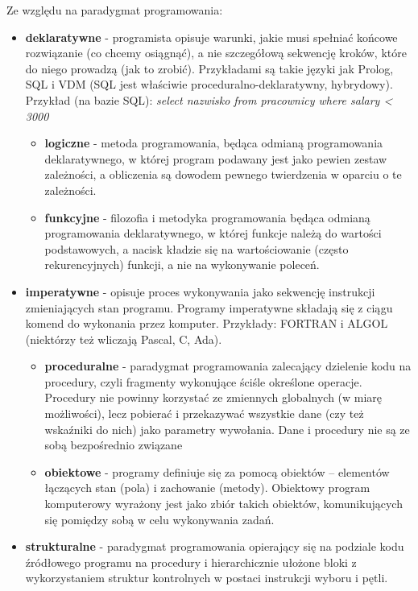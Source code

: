 \documentclass[12pt,a4paper]{article}
\begin{document}
	Ze względu na paradygmat programowania:	
	\begin{itemize}
		\item \textbf{deklaratywne} - programista opisuje warunki, jakie musi spełniać końcowe rozwiązanie (co chcemy osiągnąć), a nie szczegółową sekwencję kroków, które do niego prowadzą (jak to zrobić). Przykładami są takie języki jak Prolog, SQL i VDM (SQL jest właściwie proceduralno-deklaratywny, hybrydowy). Przykład (na bazie SQL): \textit{select nazwisko from pracownicy where salary < 3000}
		\begin{itemize}
			\item \textbf{logiczne} - metoda programowania, będąca odmianą programowania deklaratywnego, w której program podawany jest jako pewien zestaw zależności, a obliczenia są dowodem pewnego twierdzenia w oparciu o te zależności.
			\item \textbf{funkcyjne} - filozofia i metodyka programowania będąca odmianą programowania deklaratywnego, w której funkcje należą do wartości podstawowych, a nacisk kładzie się na wartościowanie (często rekurencyjnych) funkcji, a nie na wykonywanie poleceń.
		\end{itemize}
		\item \textbf{imperatywne} - opisuje proces wykonywania jako sekwencję instrukcji zmieniających stan programu. Programy imperatywne składają się z ciągu komend do wykonania przez komputer. Przykłady: FORTRAN i ALGOL (niektórzy też wliczają Pascal, C, Ada).
		\begin{itemize}
			\item \textbf{proceduralne} - paradygmat programowania zalecający dzielenie kodu na procedury, czyli fragmenty wykonujące ściśle określone operacje. Procedury nie powinny korzystać ze zmiennych globalnych (w miarę możliwości), lecz pobierać i przekazywać wszystkie dane (czy też wskaźniki do nich) jako parametry wywołania. Dane i procedury nie są ze sobą bezpośrednio związane
			\item \textbf{obiektowe} - programy definiuje się za pomocą obiektów – elementów łączących stan (pola) i zachowanie (metody). Obiektowy program komputerowy wyrażony jest jako zbiór takich obiektów, komunikujących się pomiędzy sobą w celu wykonywania zadań.
		\end{itemize}			
		\item \textbf{strukturalne} - paradygmat programowania opierający się na podziale kodu źródłowego programu na procedury i hierarchicznie ułożone bloki z wykorzystaniem struktur kontrolnych w postaci instrukcji wyboru i pętli. 
	\end{itemize}
	
\end{document}
